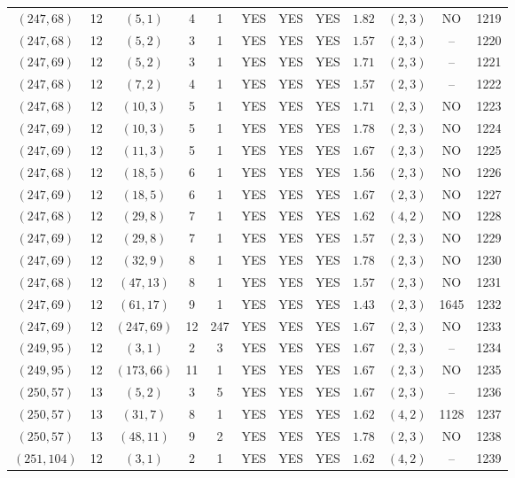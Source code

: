 \begin{longtable}{|c|c|c|c|c|c|c|c|c|c|c|c|}
$(247,68)$ & 12 & $(5,1)$ & 4 & 1 & YES & YES & YES & $1.82$ & $(2,3)$ & NO & 1219\\
$(247,68)$ & 12 & $(5,2)$ & 3 & 1 & YES & YES & YES & $1.57$ & $(2,3)$ & -- & 1220\\
$(247,69)$ & 12 & $(5,2)$ & 3 & 1 & YES & YES & YES & $1.71$ & $(2,3)$ & -- & 1221\\
$(247,68)$ & 12 & $(7,2)$ & 4 & 1 & YES & YES & YES & $1.57$ & $(2,3)$ & -- & 1222\\
$(247,68)$ & 12 & $(10,3)$ & 5 & 1 & YES & YES & YES & $1.71$ & $(2,3)$ & NO & 1223\\
$(247,69)$ & 12 & $(10,3)$ & 5 & 1 & YES & YES & YES & $1.78$ & $(2,3)$ & NO & 1224\\
$(247,69)$ & 12 & $(11,3)$ & 5 & 1 & YES & YES & YES & $1.67$ & $(2,3)$ & NO & 1225\\
$(247,68)$ & 12 & $(18,5)$ & 6 & 1 & YES & YES & YES & $1.56$ & $(2,3)$ & NO & 1226\\
$(247,69)$ & 12 & $(18,5)$ & 6 & 1 & YES & YES & YES & $1.67$ & $(2,3)$ & NO & 1227\\
$(247,68)$ & 12 & $(29,8)$ & 7 & 1 & YES & YES & YES & $1.62$ & $(4,2)$ & NO & 1228\\
$(247,69)$ & 12 & $(29,8)$ & 7 & 1 & YES & YES & YES & $1.57$ & $(2,3)$ & NO & 1229\\
$(247,69)$ & 12 & $(32,9)$ & 8 & 1 & YES & YES & YES & $1.78$ & $(2,3)$ & NO & 1230\\
$(247,68)$ & 12 & $(47,13)$ & 8 & 1 & YES & YES & YES & $1.57$ & $(2,3)$ & NO & 1231\\
$(247,69)$ & 12 & $(61,17)$ & 9 & 1 & YES & YES & YES & $1.43$ & $(2,3)$ & 1645 & 1232\\
$(247,69)$ & 12 & $(247,69)$ & 12 & 247 & YES & YES & YES & $1.67$ & $(2,3)$ & NO & 1233\\
$(249,95)$ & 12 & $(3,1)$ & 2 & 3 & YES & YES & YES & $1.67$ & $(2,3)$ & -- & 1234\\
$(249,95)$ & 12 & $(173,66)$ & 11 & 1 & YES & YES & YES & $1.67$ & $(2,3)$ & NO & 1235\\
$(250,57)$ & 13 & $(5,2)$ & 3 & 5 & YES & YES & YES & $1.67$ & $(2,3)$ & -- & 1236\\
$(250,57)$ & 13 & $(31,7)$ & 8 & 1 & YES & YES & YES & $1.62$ & $(4,2)$ & 1128 & 1237\\
$(250,57)$ & 13 & $(48,11)$ & 9 & 2 & YES & YES & YES & $1.78$ & $(2,3)$ & NO & 1238\\
$(251,104)$ & 12 & $(3,1)$ & 2 & 1 & YES & YES & YES & $1.62$ & $(4,2)$ & -- & 1239\\

\end{longtable}
